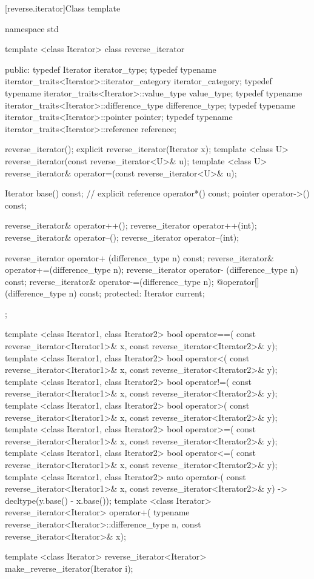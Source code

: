 [reverse.iterator]{Class template }

%
\begin{codeblock}
namespace std {
  template <class Iterator>
  class reverse_iterator {
  public:
    typedef Iterator                                              iterator_type;
    typedef typename iterator_traits<Iterator>::iterator_category iterator_category;
    typedef typename iterator_traits<Iterator>::value_type        value_type;
    typedef typename iterator_traits<Iterator>::difference_type   difference_type;
    typedef typename iterator_traits<Iterator>::pointer           pointer;
    typedef typename iterator_traits<Iterator>::reference         reference;

    reverse_iterator();
    explicit reverse_iterator(Iterator x);
    template <class U> reverse_iterator(const reverse_iterator<U>& u);
    template <class U> reverse_iterator& operator=(const reverse_iterator<U>& u);

    Iterator base() const;      // explicit
    reference operator*() const;
    pointer   operator->() const;

    reverse_iterator& operator++();
    reverse_iterator  operator++(int);
    reverse_iterator& operator--();
    reverse_iterator  operator--(int);

    reverse_iterator  operator+ (difference_type n) const;
    reverse_iterator& operator+=(difference_type n);
    reverse_iterator  operator- (difference_type n) const;
    reverse_iterator& operator-=(difference_type n);
    @\unspec@ operator[](difference_type n) const;
  protected:
    Iterator current;
  };

  template <class Iterator1, class Iterator2>
    bool operator==(
      const reverse_iterator<Iterator1>& x,
      const reverse_iterator<Iterator2>& y);
  template <class Iterator1, class Iterator2>
    bool operator<(
      const reverse_iterator<Iterator1>& x,
      const reverse_iterator<Iterator2>& y);
  template <class Iterator1, class Iterator2>
    bool operator!=(
      const reverse_iterator<Iterator1>& x,
      const reverse_iterator<Iterator2>& y);
  template <class Iterator1, class Iterator2>
    bool operator>(
      const reverse_iterator<Iterator1>& x,
      const reverse_iterator<Iterator2>& y);
  template <class Iterator1, class Iterator2>
    bool operator>=(
      const reverse_iterator<Iterator1>& x,
      const reverse_iterator<Iterator2>& y);
  template <class Iterator1, class Iterator2>
    bool operator<=(
      const reverse_iterator<Iterator1>& x,
      const reverse_iterator<Iterator2>& y);
  template <class Iterator1, class Iterator2>
    auto operator-(
      const reverse_iterator<Iterator1>& x,
      const reverse_iterator<Iterator2>& y) -> decltype(y.base() - x.base());
  template <class Iterator>
    reverse_iterator<Iterator> operator+(
      typename reverse_iterator<Iterator>::difference_type n,
      const reverse_iterator<Iterator>& x);

  template <class Iterator>
    reverse_iterator<Iterator> make_reverse_iterator(Iterator i);      
}
\end{codeblock}

